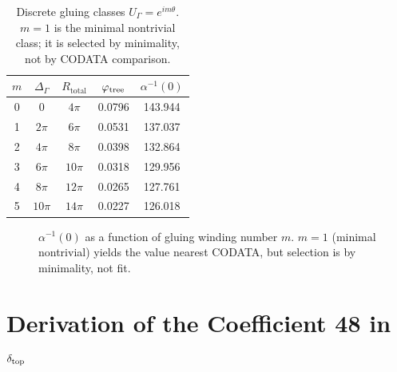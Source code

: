 \begin{table}[H]
\centering\small
\begin{tabular}{@{}ccccc@{}}
\toprule
$m$ & $\Delta_\Gamma$ & $R_{\text{total}}$ & $\varphi_{\mathrm{tree}}$ & $\alpha^{-1}(0)$\\
\midrule
0 & 0        & $4\pi$  & 0.0796 & 143.944\\
1 & $2\pi$   & $6\pi$  & 0.0531 & 137.037\\
2 & $4\pi$   & $8\pi$  & 0.0398 & 132.864\\
3 & $6\pi$   & $10\pi$ & 0.0318 & 129.956\\
4 & $8\pi$   & $12\pi$ & 0.0265 & 127.761\\
5 & $10\pi$  & $14\pi$ & 0.0227 & 126.018\\
\bottomrule
\end{tabular}
\caption{Discrete gluing classes $U_\Gamma=e^{im\theta}$.
  $m=1$ is the minimal nontrivial class; it is selected by minimality, not by
  CODATA comparison.}
\label{tab:gluing-scan}
\end{table}

\begin{figure}[H]
\centering
{}
\caption{$\alpha^{-1}(0)$ as a function of gluing winding number $m$.
  $m=1$ (minimal nontrivial) yields the value nearest CODATA,
  but selection is by minimality, not fit.}
\label{fig:gluing-scan}
\end{figure}

\section{\texorpdfstring{Derivation of the Coefficient 48 in $\delta_{\mathrm{top}}$}{Derivation of the Coefficient 48 in delta_top}}
\label{app:48deriv}

